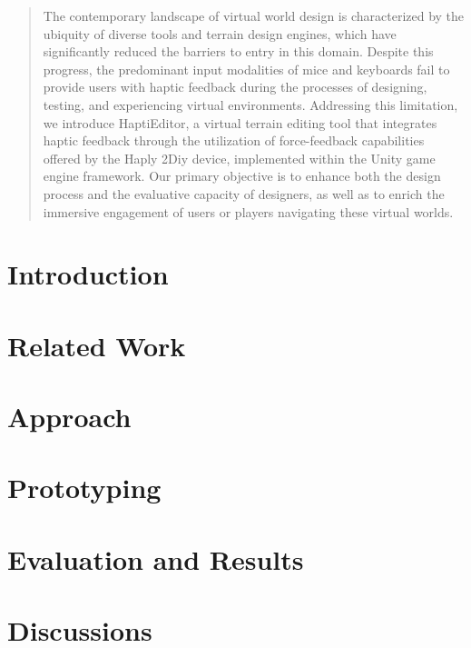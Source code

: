 \documentclass[manuscript,screen,review]{acmart}
\begin{document}


\begin{abstract}
The contemporary landscape of virtual world design is characterized by the ubiquity of diverse tools and terrain design engines, which have significantly reduced the barriers to entry in this domain. Despite this progress, the predominant input modalities of mice and keyboards fail to provide users with haptic feedback during the processes of designing, testing, and experiencing virtual environments. Addressing this limitation, we introduce HaptiEditor, a virtual terrain editing tool that integrates haptic feedback through the utilization of force-feedback capabilities offered by the Haply 2Diy device, implemented within the Unity game engine framework. Our primary objective is to enhance both the design process and the evaluative capacity of designers, as well as to enrich the immersive engagement of users or players navigating these virtual worlds.  
\end{abstract}


\maketitle

\section{Introduction} \label{sec:intro}


\section{Related Work} \label{sec:rel_work}


\section{Approach} \label{sec:approach}


\section{Prototyping} \label{sec:prototyping}


\section{Evaluation and Results} \label{sec:evaluation}


\section{Discussions} \label{sec:discussions}









\end{document}
